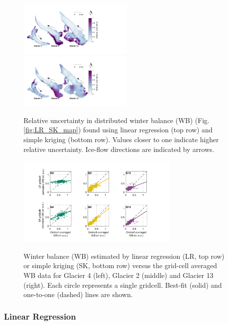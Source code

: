 \documentclass[review,oneside, letterpaper]{igs}
\begin{document}
\begin{figure}
	\centering
	\includegraphics[width =0.5\textwidth]{SpatialVar_LR.pdf}\\
	\includegraphics[width =0.5\textwidth]{SpatialVar_SK.pdf}\\
	\caption{Relative uncertainty in distributed winter balance (WB) (Fig. \ref{fig:LR_SK_map}) found using linear regression (top row) and simple kriging (bottom row). Values closer to one indicate higher relative uncertainty. Ice-flow directions are indicated by arrows.}
	\label{fig:WSMBspatialvar}
\end{figure}

\begin{figure}
	\centering
	\includegraphics[width =0.7\textwidth]{observedVSestimated_S2.pdf}\\
	\caption{Winter balance (WB) estimated by linear regression (LR, top row) or simple kriging (SK, bottom row) versus the grid-cell averaged WB data for Glacier 4 (left), Glacier 2 (middle) and Glacier 13 (right). Each circle represents a single gridcell. Best-fit (solid) and one-to-one (dashed) lines are shown.}
	\label{fig:observedVSestimated_S2}
\end{figure}

\subsubsection{Linear Regression}
\end{document}
